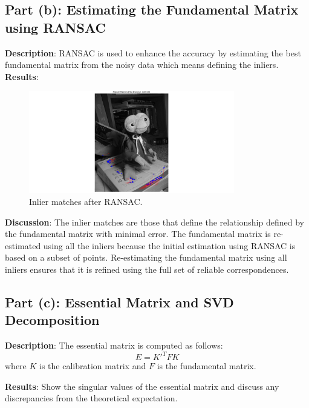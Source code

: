 \documentclass{article}
\begin{document}
\subsection{Part (b): Estimating the Fundamental Matrix using RANSAC}
\textbf{Description}: %
RANSAC is used to enhance the accuracy by estimating the best fundamental matrix from the noisy data which means defining the inliers. 
\textbf{Results}: %

\begin{figure}[h!]
    \centering
    \includegraphics[trim={15cm 0 15cm 0}, clip, width=0.8\textwidth]{Figure_3.png}
    \caption{Inlier matches after RANSAC.}
\end{figure}

\textbf{Discussion}: %
The inlier matches are those that define the relationship defined by the fundamental matrix with minimal error. The fundamental matrix is re-estimated using all the inliers
because the initial estimation using RANSAC is based on a subset of points. 
Re-estimating the fundamental matrix using all inliers ensures that it is refined using the full set of reliable correspondences.

\subsection{Part (c): Essential Matrix and SVD Decomposition}
\textbf{Description}: %
The essential matrix is computed as follows:
\[
E = K'^{T} F K
\]
where $K$ is the calibration matrix and $F$ is the fundamental matrix.

\textbf{Results}: Show the singular values of the essential matrix and discuss any discrepancies from the theoretical expectation.
\end{document}
